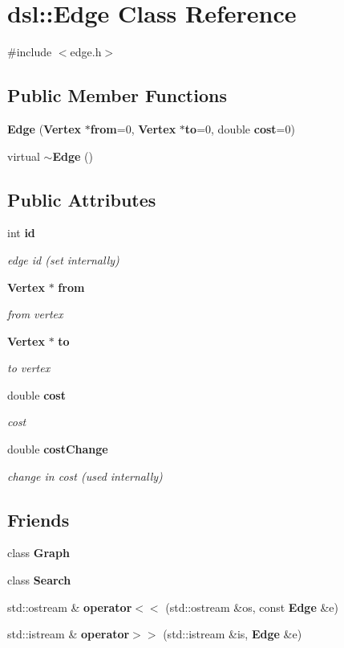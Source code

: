 \section{dsl\-:\-:Edge Class Reference}
\label{classdsl_1_1Edge}


{\ttfamily \#include $<$edge.\-h$>$}

\subsection*{Public Member Functions}
\begin{DoxyCompactItemize}
\item 
{\bf Edge} ({\bf Vertex} $\ast${\bf from}=0, {\bf Vertex} $\ast${\bf to}=0, double {\bf cost}=0)
\item 
virtual {\bf $\sim$\-Edge} ()
\end{DoxyCompactItemize}
\subsection*{Public Attributes}
\begin{DoxyCompactItemize}
\item 
int {\bf id}
\begin{DoxyCompactList}\small\item\em edge id (set internally) \end{DoxyCompactList}\item 
{\bf Vertex} $\ast$ {\bf from}
\begin{DoxyCompactList}\small\item\em from vertex \end{DoxyCompactList}\item 
{\bf Vertex} $\ast$ {\bf to}
\begin{DoxyCompactList}\small\item\em to vertex \end{DoxyCompactList}\item 
double {\bf cost}
\begin{DoxyCompactList}\small\item\em cost \end{DoxyCompactList}\item 
double {\bf cost\-Change}
\begin{DoxyCompactList}\small\item\em change in cost (used internally) \end{DoxyCompactList}\end{DoxyCompactItemize}
\subsection*{Friends}
\begin{DoxyCompactItemize}
\item 
class {\bf Graph}
\item 
class {\bf Search}
\item 
std\-::ostream \& {\bf operator$<$$<$} (std\-::ostream \&os, const {\bf Edge} \&e)
\item 
std\-::istream \& {\bf operator$>$$>$} (std\-::istream \&is, {\bf Edge} \&e)
\end{DoxyCompactItemize}


